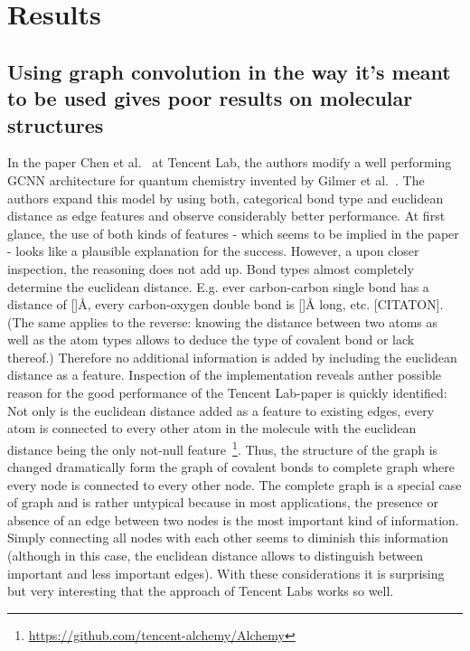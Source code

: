 \chapter{Results}
\label{chapter:Results}


\section{Using graph convolution in the way it's meant to be used gives poor results on molecular structures}

In the paper Chen et al.~\cite{Chen2019} at Tencent Lab, the authors modify a well performing GCNN architecture for quantum chemistry invented by Gilmer et al.~\cite{Gilmer2017}. The authors expand this model by using both, categorical bond type and euclidean distance as edge features and observe considerably better performance. At first glance, the use of both kinds of features - which seems to be implied in the paper - looks like a plausible explanation for the success. However, a upon closer inspection, the reasoning does not add up. Bond types almost completely determine the euclidean distance. E.g. ever carbon-carbon single bond has a distance of []Å, every carbon-oxygen double bond is []Å long, etc. [CITATON]. (The same applies to the reverse: knowing the distance between two atoms as well as the atom types allows to deduce the type of covalent bond or lack thereof.) Therefore no additional information is added by including the euclidean distance as a feature. Inspection of the implementation reveals anther possible reason for the good performance of the Tencent Lab-paper is quickly identified: Not only is the euclidean distance added as a feature to existing edges, every atom is connected to every other atom in the molecule with the euclidean distance being the only not-null feature~\footnote{\url{https://github.com/tencent-alchemy/Alchemy}}. Thus, the structure of the graph is changed dramatically form the graph of covalent bonds to complete graph where every node is connected to every other node. The complete graph is a special case of graph and is rather untypical because in most applications, the presence or absence of an edge between two nodes is the most important kind of information. Simply connecting all nodes with each other seems to diminish this information (although in this case, the euclidean distance allows to distinguish between important and less important edges). With these considerations it is surprising but very interesting that the approach of Tencent Labs works so well.

